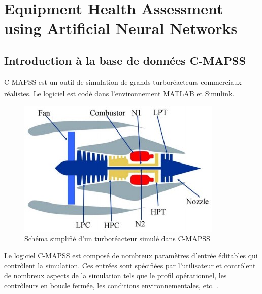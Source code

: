 \chapter{Equipment Health Assessment using Artificial Neural Networks}


\section{Introduction à la base de données C-MAPSS}

C-MAPSS est un outil de simulation de grands turboréacteurs commerciaux réalistes. Le logiciel est codé dans l'environnement MATLAB\textsuperscript{\textregistered} et Simulink\textsuperscript{\textregistered}.

\begin{figure}
    \centering
    \includegraphics[width=.48\textwidth]{figures/c-mapss-engine-diagram.jpg}
    \caption{Schéma simplifié d'un turboréacteur simulé dans C-MAPSS \cite{Saxena2008}}
    \label{figure:c-mapss-engine-diagram}    
\end{figure}

Le logiciel C-MAPSS est composé de nombreux paramètres d'entrée éditables qui contrôlent la simulation. Ces entrées sont spécifiées par l'utilisateur et contrôlent de nombreux aspects de la simulation tels que le profil opérationnel, les contrôleurs en boucle fermée, les conditions environnementales, etc. \cite{Saxena2008}. 

